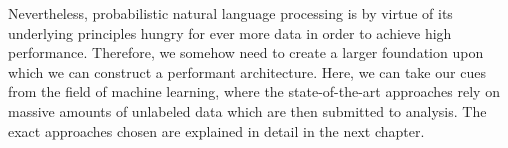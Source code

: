 Nevertheless, probabilistic natural language processing is by virtue
of its underlying principles hungry for ever more data in order to
achieve high performance. Therefore, we somehow need to create a
larger foundation upon which we can construct a performant
architecture. Here, we can take our cues from the field of machine
learning, where the state-of-the-art approaches rely on massive
amounts of unlabeled data which are then submitted to analysis. The
exact approaches chosen are explained in detail in the next chapter.




